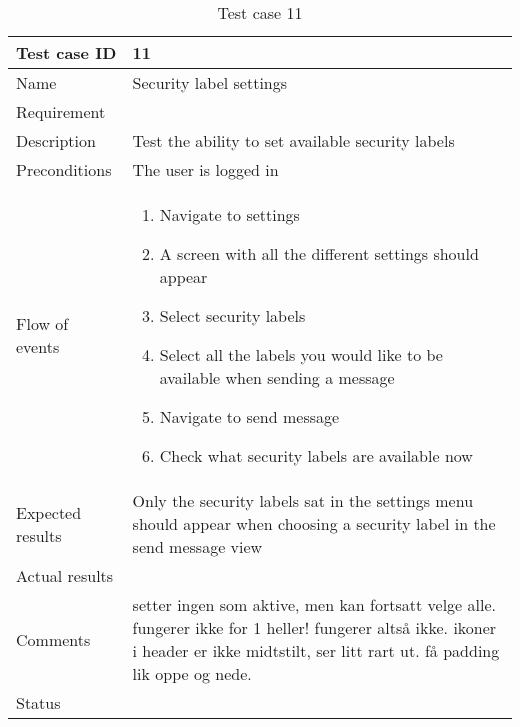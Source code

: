 \begin{table}
\begin{tabular}{l|p{10cm}}
Test case ID & 11 \\ \hline
Name & Security label settings\\ \hline
Requirement & \\ \hline
Description & Test the ability to set available security labels\\ \hline
Preconditions & The user is logged in\\ \hline
Flow of events & 
\begin{enumerate}
\item{}Navigate to settings
\item{}A screen with all the different settings should appear
\item{}Select security labels
\item{}Select all the labels you would like to be available when sending a message
\item{}Navigate to send message
\item{}Check what security labels are available now
\end{enumerate} \\ \hline
Expected results & Only the security labels sat in the settings menu should appear when choosing a security label in the send message view\\ \hline \hline
Actual results & \\ \hline
Comments & setter ingen som aktive, men kan fortsatt velge alle. fungerer ikke for 1 heller! fungerer altså ikke. ikoner i header er ikke midtstilt, ser litt rart ut. få padding lik oppe og nede.\\ \hline
Status & 
\end{tabular}
\caption{Test case 11} \label{tab:case11}
\end{table}
